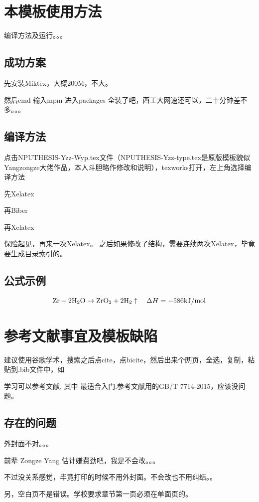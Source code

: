 \documentclass[twoside, workbib, UTF8, phd]{nputhesis}
\begin{document}
\chapter{本模板使用方法}
编译方法及运行。。。
\section{成功方案}
先安装Miktex，大概200M，不大。\par
然后cmd 输入mpm 进入packages 全装了吧，西工大网速还可以，二十分钟差不多。。。
\section{编译方法}
点击NPUTHESIS-Yzz-Wyp.tex文件（NPUTHESIS-Yzz-type.tex是原版模板貌似Yangzongze大佬作品，本人斗胆略作修改和说明），texworks打开，左上角选择编译方法\par
先Xelatex\par\par
再Biber\par\par
再Xelatex\par\par
保险起见，再来一次Xelatex。
之后如果修改了结构，需要连续两次Xelatex，毕竟要生成目录索引的。

\section{公式示例}
\begin{equation}
    \setlength{\abovedisplayskip}{5pt}
    \setlength{\belowdisplayskip}{5pt}
    \mathrm{Zr}+2 \mathrm{H}_{2} \mathrm{O} \rightarrow \mathrm{ZrO}_{2}+2 \mathrm{H}_{2} \uparrow \quad \Delta H=-586 \mathrm{kJ} / \mathrm{mol}
    \label{eagehejin}
\end{equation}

\chapter{参考文献事宜及模板缺陷}
建议使用谷歌学术，搜索之后点cite，点bicite，然后出来个网页，全选，复制，粘贴到.bib文件中，如\par
学习可以参考文献\cite{Knuth1986,Lamport1994,Liu2013}, 其中 \cite{Liu2013} 最适合入门.参考文献用的GB/T 7714-2015，应该没问题。
\section{存在的问题}
外封面不对。。。\par
前辈 Zongze Yang 估计嫌费劲吧，我是不会改。。。\par
不过没关系感觉，毕竟打印的时候不用外封面。不会改也不用纠结。。\par\par
另，空白页不是错误。学校要求章节第一页必须在单面页的。
\end{document}
